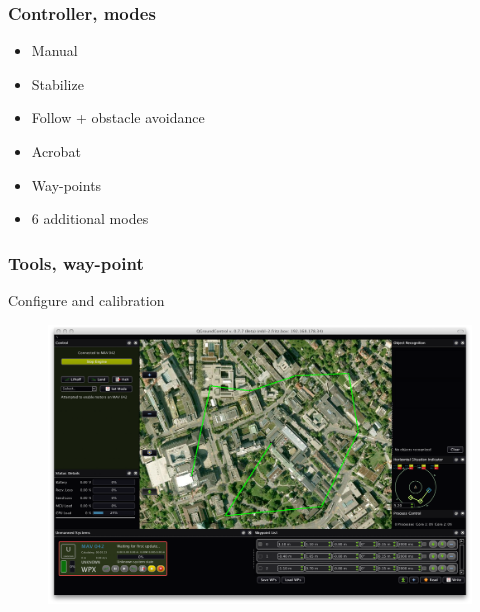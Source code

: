 \begin{frame}
\frametitle{Controller, modes}

  \begin{itemize}
    \item Manual    
    \item Stabilize    
	\item Follow + obstacle avoidance
	\item Acrobat 	
    \item Way-points   
	\item 6 additional modes 
  \end{itemize}
  
\end{frame}



\begin{frame}
\frametitle{Tools, way-point}

  Configure and calibration
  \begin{figure}
  \includegraphics[scale=0.17]{pic/03_our-copter/qgroundcontrol.png}
  \end{figure}
  
\end{frame}



